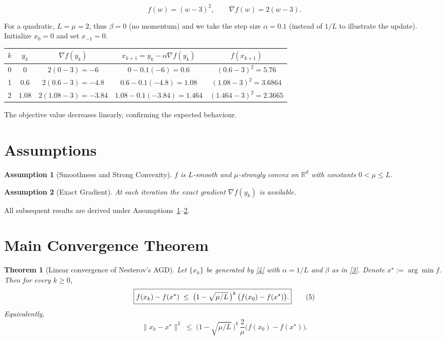 \documentclass{article}
\newtheorem{theorem}{Theorem}
\newtheorem{assumption}{Assumption}
\begin{document}
\[
f(w)=(w-3)^{2},\qquad \nabla f(w)=2(w-3).
\]

For a quadratic, $L=\mu=2$, thus $\beta=0$ (no momentum) and we take the
step size $\alpha=0.1$ (instead of $1/L$ to illustrate the update).  
Initialize $x_{0}=0$ and set $x_{-1}=0$.

\begin{center}
\begin{tabular}{c|c|c|c|c}
$k$ & $y_{k}$ & $\nabla f(y_{k})$ & $x_{k+1}=y_{k}-\alpha\nabla f(y_{k})$ & $f(x_{k+1})$\\\hline
0 & $0$ & $2(0-3)=-6$ & $0-0.1(-6)=0.6$ & $(0.6-3)^{2}=5.76$\\
1 & $0.6$ & $2(0.6-3)=-4.8$ & $0.6-0.1(-4.8)=1.08$ & $(1.08-3)^{2}=3.6864$\\
2 & $1.08$ & $2(1.08-3)=-3.84$ & $1.08-0.1(-3.84)=1.464$ & $(1.464-3)^{2}=2.3665$
\end{tabular}
\end{center}

The objective value decreases linearly, confirming the expected behaviour.

\section*{Assumptions}
\begin{assumption}[Smoothness and Strong Convexity]\label{ass:sc}
$f$ is $L$‑smooth and $\mu$‑strongly convex on $\mathbb{R}^{d}$ with constants
$0<\mu\le L$.
\end{assumption}
\begin{assumption}[Exact Gradient]\label{ass:grad}
At each iteration the exact gradient $\nabla f(y_{k})$ is available.
\end{assumption}
All subsequent results are derived under Assumptions~\ref{ass:sc}–\ref{ass:grad}.

\section*{Main Convergence Theorem}
\begin{theorem}[Linear convergence of Nesterov’s AGD]\label{thm:linear}
Let $\{x_{k}\}$ be generated by \eqref{4} with $\alpha=1/L$ and
$\beta$ as in \eqref{3}.  Denote $x^{\star}:=\arg\min f$.  Then for every $k\ge 0$,
\[
\boxed{%
f(x_{k})-f(x^{\star})\;\le\;
\bigl(1-\sqrt{\mu/L}\,\bigr)^{k}\,
\bigl(f(x_{0})-f(x^{\star})\bigr).}
\tag{5}
\]
Equivalently,
\[
\|x_{k}-x^{\star}\|^{2}\;\le\;
\bigl(1-\sqrt{\mu/L}\,\bigr)^{k}\,
\frac{2}{\mu}\bigl(f(x_{0})-f(x^{\star})\bigr).
\tag{6}
\]
\end{theorem}
\end{document}
